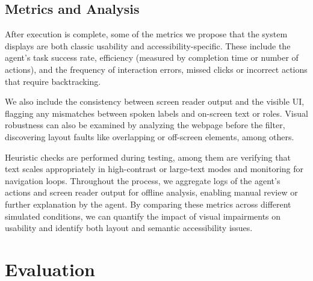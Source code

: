 \subsection{Metrics and Analysis}


After execution is complete, some of the metrics we propose that the system displays are both classic usability and accessibility-specific. These include the agent's task success rate, efficiency (measured by completion time or number of actions), and the frequency of interaction errors, missed clicks or incorrect actions that require backtracking. 

We also include the consistency between screen reader output and the visible \ac{UI}, flagging any mismatches between spoken labels and on-screen text or roles. Visual robustness can also be examined by analyzing the webpage before the filter, discovering layout faults like overlapping or off-screen elements, among others. 

Heuristic checks are performed during testing, among them are verifying that text scales appropriately in high-contrast or large-text modes and monitoring for navigation loops. Throughout the process, we aggregate logs of the agent's actions and screen reader output for offline analysis, enabling manual review or further explanation by the agent. By comparing these metrics across different simulated conditions, we can quantify the impact of visual impairments on usability and identify both layout and semantic accessibility issues.


\section{Evaluation}

